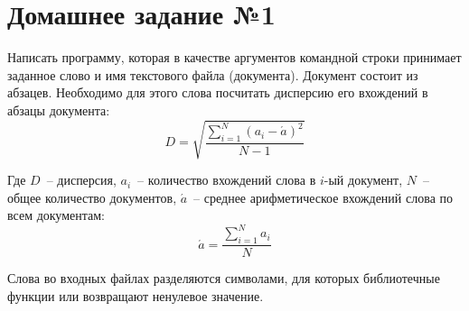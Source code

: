 \section*{Домашнее задание №1}

Написать программу, которая в качестве аргументов командной строки
принимает заданное слово и имя текстового файла (документа). Документ
состоит из абзацев. Необходимо для этого слова посчитать дисперсию его
вхождений в абзацы документа:
$$
	D=\sqrt{ \frac{ \sum^N_{i = 1}{ (a_i-\acute{a})^2 } }{ N - 1 } }
$$

Где $D$~-- дисперсия, $a_i$~-- количество вхождений слова в $i$-ый документ, $N$~-- общее количество документов,
$\acute{a}$~-- среднее арифметическое вхождений слова по всем документам:
$$
	\acute{a} = \frac{ \sum^N_{i=1}{a_i} }{N}
$$

Слова во входных файлах разделяются символами, для которых
библиотечные функции  или  возвращают ненулевое
значение.
